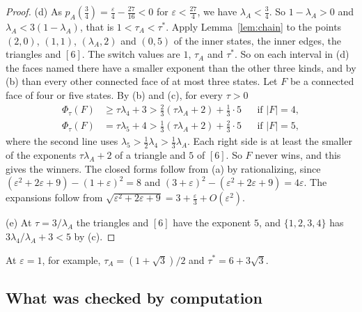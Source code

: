 \documentclass[EJP,preprint]{ejpecp}
\begin{document}
\begin{proof}
(d) As $p_A(\frac34)=\frac\varepsilon4-\frac{27}{16}<0$ for
$\varepsilon<\frac{27}4$, we have $\lambda_A<\frac34$. So $1-\lambda_A>0$ and
$\lambda_A<3(1-\lambda_A)$, that is $1<\tau_A<\tau^*$. Apply
Lemma~\ref{lem:chain} to the points $(2,0)$, $(1,1)$, $(\lambda_A,2)$ and
$(0,5)$ of the inner states, the inner edges, the triangles and $[6]$. The
switch values are $1$, $\tau_A$ and $\tau^*$. So on each interval in (d) the
faces named there have a smaller exponent than the other three kinds, and by (b)
than every other connected face of at most three states. Let $F$ be a
connected face of four or five states. By (b) and (c), for every $\tau>0$
\begin{align*}
 \Phi_\tau(F)&\ge\tau\lambda_4+3>\tfrac23(\tau\lambda_A+2)+\tfrac13\cdot5
 &&\text{if }\lvert F\rvert=4,\\
 \Phi_\tau(F)&=\tau\lambda_5+4>\tfrac13(\tau\lambda_A+2)+\tfrac23\cdot5
 &&\text{if }\lvert F\rvert=5,
\end{align*}
where the second line uses $\lambda_5>\frac12\lambda_4>\frac13\lambda_A$. Each
right side is at least the smaller of the exponents $\tau\lambda_A+2$ of a
triangle and $5$ of $[6]$. So $F$ never wins, and this gives the winners. The closed forms follow from (a) by rationalizing, since
$(\varepsilon^2+2\varepsilon+9)-(1+\varepsilon)^2=8$ and
$(3+\varepsilon)^2-(\varepsilon^2+2\varepsilon+9)=4\varepsilon$. The
expansions follow from
$\sqrt{\varepsilon^2+2\varepsilon+9}=3+\frac\varepsilon3+O(\varepsilon^2)$.

(e) At $\tau=3/\lambda_A$ the triangles and $[6]$ have the exponent $5$, and
$\{1,2,3,4\}$ has $3\lambda_4/\lambda_A+3<5$ by (c).
\end{proof}

At $\varepsilon=1$, for example, $\tau_A=(1+\sqrt3)/2$ and
$\tau^*=6+3\sqrt3$.

\subsection{What was checked by computation}\label{app:examples-checks}
\end{document}
